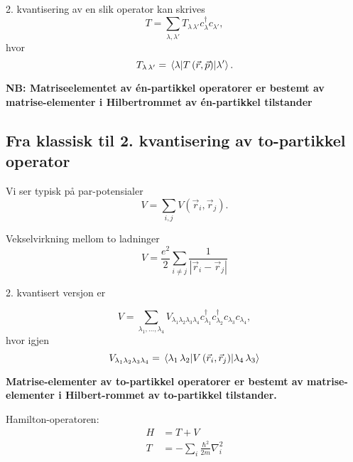 2. kvantisering av en slik operator kan skrives
\begin{equation}
T = \sum_{\lambda, \lambda'} T_{\lambda\,\lambda'}c_\lambda^\dagger c_{\lambda'},
\end{equation}
hvor 
\begin{equation}
T_{\lambda\,\lambda'} = \mel{\lambda}{T\left(\vec{r}, \vec{p}\right)}{\lambda'}.	
\end{equation}

\textbf{NB: Matriseelementet av én-partikkel operatorer er bestemt av matrise-elementer i Hilbertrommet av én-partikkel tilstander}

\subsection{Fra klassisk til 2. kvantisering av to-partikkel operator}

Vi ser typisk på par-potensialer 
\begin{equation}
V = \sum_{i, j} V\left(\vec{r}_i, \vec{r}_j\right).
\end{equation}

\begin{theorem}
Vekselvirkning mellom to ladninger
\begin{equation}
V = \frac{e^2}{2}\sum_{i\ne j} \frac{1}{|\vec{r}_i - \vec{r}_j|}
\end{equation}
\end{theorem}

2. kvantisert versjon er

\begin{equation}
V = \sum_{\lambda_1, \dots, \lambda_4} V_{\lambda_1\lambda_2\lambda_3\lambda_4}c_{\lambda_1}^\dagger c_{\lambda_2}^\dagger c_{\lambda_3}c_{\lambda_4},
\end{equation}
hvor igjen
\begin{equation}
V_{\lambda_1\lambda_2\lambda_3\lambda_4} = \mel{\lambda_1\,\lambda_2}{V\left(\vec{r}_i, \vec{r}_j\right)}{\lambda_4\,\lambda_3}
\end{equation}

\textbf{Matrise-elementer av to-partikkel operatorer er bestemt av matrise-elementer i Hilbert-rommet av to-partikkel tilstander.}

Hamilton-operatoren:
\begin{align}
H &= T + V \label{eq:hamiltonian} \\
T &= -\sum_i \frac{\hbar^2}{2m}\nabla_i^2
\end{align}

